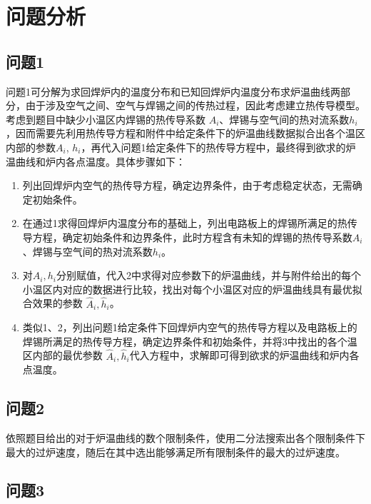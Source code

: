 \documentclass[../main.tex]{subfiles}
\begin{document}
\section{问题分析}
\subsection{问题1}
问题1可分解为求回焊炉内的温度分布和已知回焊炉内温度分布求炉温曲线两部分，由于涉及空气之间、空气与焊锡之间的传热过程，因此考虑建立热传导模型。考虑到题目中缺少小温区内焊锡的热传导系数 \(A_i\)、焊锡与空气间的热对流系数\(h_i\)，因而需要先利用热传导方程和附件中给定条件下的炉温曲线数据拟合出各个温区内部的参数\(A_{i}\), \(h_{i}\)，再代入问题1给定条件下的热传导方程中，最终得到欲求的炉温曲线和炉内各点温度。具体步骤如下：
\begin{enumerate}
\item 列出回焊炉内空气的热传导方程，确定边界条件，由于考虑稳定状态，无需确定初始条件。
\item 在通过1求得回焊炉内温度分布的基础上，列出电路板上的焊锡所满足的热传导方程，确定初始条件和边界条件，此时方程含有未知的焊锡的热传导系数\(A_{i}\)、焊锡与空气间的热对流系数\(h_{i}\)。
\item 对\(A_{i}, h_{i}\)分别赋值，代入2中求得对应参数下的炉温曲线，并与附件给出的每个小温区内对应的数据进行比较，找出对每个小温区对应的炉温曲线具有最优拟合效果的参数 \(\hat A _{i} , \hat h_{i}\)。
\item 类似1、2，列出问题1给定条件下回焊炉内空气的热传导方程以及电路板上的焊锡所满足的热传导方程，确定边界条件和初始条件，并将3中找出的各个温区内部的最优参数 \(\hat A _{i} , \hat h _{i}\)代入方程中，求解即可得到欲求的炉温曲线和炉内各点温度。
\end{enumerate}

\subsection{问题2}
依照题目给出的对于炉温曲线的数个限制条件，使用二分法搜索出各个限制条件下最大的过炉速度，随后在其中选出能够满足所有限制条件的最大的过炉速度。
\subsection{问题3}
\end{document}
